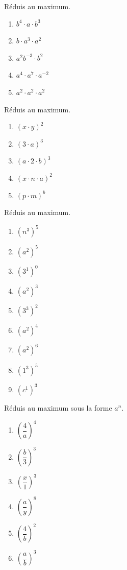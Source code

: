 \setcounter{exercise}{0}

\begin{exercise}
  Réduis au maximum.
  \begin{enumerate}[cols=5]
    \item \(b^{4} \cdot a \cdot b^{3}\)
    \item \(b \cdot a^{3} \cdot a^{2}\)
    \item \(a^{2}b^{-3} \cdot b^{2}\)
    \item \(a^{4} \cdot a^{7} \cdot a^{-2}\)
    \item \(a^{2} \cdot a^{2} \cdot a^{2}\)
  \end{enumerate}
\end{exercise}

\begin{exercise}
  Réduis au maximum.
  \begin{enumerate}[cols=5]
    \item \((x \cdot y)^{2} \)
    \item \((3 \cdot a)^{3} \)
    \item \((a \cdot 2 \cdot b)^{3} \)
    \item \((x \cdot n \cdot a)^{2} \)
    \item \((p \cdot m)^{b} \)
  \end{enumerate}
\end{exercise}

\begin{exercise}
  Réduis au maximum.
  \begin{enumerate}[cols=6]
    \item \(\left( n^{3} \right)^{5}\)
    \item \(\left( a^{2} \right)^{5}\)
    \item \(\left( 3^{1} \right)^{0}\)
    \item \(\left( a^{2} \right)^{3}\)
    \item \(\left( 3^{3} \right)^{2}\)
    \item \(\left( a^{2} \right)^{4}\)
    \item \(\left( a^{2} \right)^{6}\)
    \item \(\left( 1^{3} \right)^{5}\)
    \item \(\left( c^{1} \right)^{3}\)
  \end{enumerate}
\end{exercise}

\begin{exercise}
  Réduis au maximum sous la forme $a^n$.
  \begin{enumerate}[cols=6]
    \item \(\left( \dfrac{4}{a} \right)^{4}\)
    \item \(\left( \dfrac{b}{3} \right)^{3}\)
    \item \(\left( \dfrac{x}{1} \right)^{3}\)
    \item \(\left( \dfrac{a}{y} \right)^{8}\)
    \item \(\left( \dfrac{4}{b} \right)^{2}\)
    \item \(\left( \dfrac{a}{b} \right)^{3}\)
  \end{enumerate}
\end{exercise}

